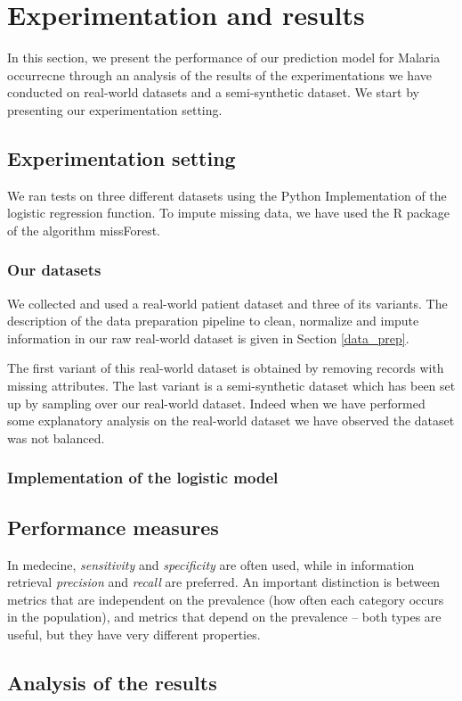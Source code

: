 \section{Experimentation and results}\label{experimentation}
In this section, we present the performance of our prediction
 model for Malaria occurrecne through an analysis of the results
 of the experimentations we have conducted on real-world datasets
and a semi-synthetic dataset. We start by presenting our experimentation setting.
 
\subsection{Experimentation setting}
We ran tests on three different datasets using the Python Implementation of the logistic regression function.
To impute missing data, we have used the R package of the algorithm missForest.

\subsubsection{Our datasets}
We collected and used a real-world patient dataset and three of its variants. The description of the data preparation
pipeline to clean, normalize and impute information in our raw  real-world dataset is given in Section \ref{data_prep}.

The first variant of this real-world dataset is obtained by removing records with missing attributes. 
The last variant is a semi-synthetic dataset which has been set up by sampling over our real-world 
dataset. Indeed when we have performed some explanatory analysis on the real-world dataset we have 
observed the dataset was not balanced.

\subsubsection{Implementation of the logistic model}



\subsection{Performance measures}
In medecine, \emph{sensitivity} and \emph{specificity} are often used, 
while in information retrieval \emph{precision} and \emph{recall} are preferred.
An important distinction is between metrics that are independent on the prevalence
(how often each category occurs in the population), and metrics that depend on the
prevalence – both types are useful, but they have very different properties.

\subsection{Analysis of the results}

